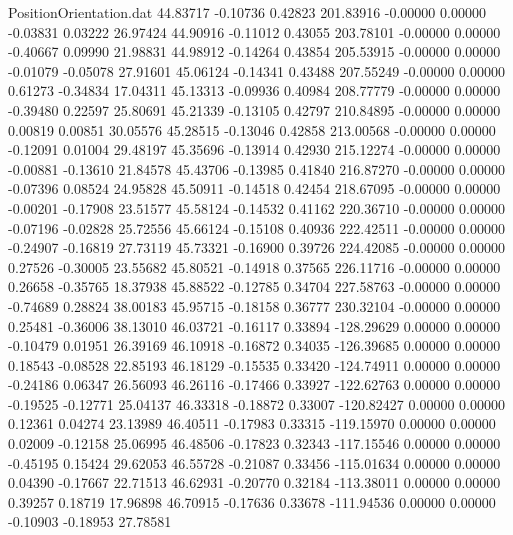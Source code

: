 \begin{filecontents}{PositionOrientation.dat}
  44.83717   -0.10736    0.42823   201.83916   -0.00000    0.00000   -0.03831    0.03222   26.97424
  44.90916   -0.11012    0.43055   203.78101   -0.00000    0.00000   -0.40667    0.09990   21.98831
  44.98912   -0.14264    0.43854   205.53915   -0.00000    0.00000   -0.01079   -0.05078   27.91601
  45.06124   -0.14341    0.43488   207.55249   -0.00000    0.00000    0.61273   -0.34834   17.04311
  45.13313   -0.09936    0.40984   208.77779   -0.00000    0.00000   -0.39480    0.22597   25.80691
  45.21339   -0.13105    0.42797   210.84895   -0.00000    0.00000    0.00819    0.00851   30.05576
  45.28515   -0.13046    0.42858   213.00568   -0.00000    0.00000   -0.12091    0.01004   29.48197
  45.35696   -0.13914    0.42930   215.12274   -0.00000    0.00000   -0.00881   -0.13610   21.84578
  45.43706   -0.13985    0.41840   216.87270   -0.00000    0.00000   -0.07396    0.08524   24.95828
  45.50911   -0.14518    0.42454   218.67095   -0.00000    0.00000   -0.00201   -0.17908   23.51577
  45.58124   -0.14532    0.41162   220.36710   -0.00000    0.00000   -0.07196   -0.02828   25.72556
  45.66124   -0.15108    0.40936   222.42511   -0.00000    0.00000   -0.24907   -0.16819   27.73119
  45.73321   -0.16900    0.39726   224.42085   -0.00000    0.00000    0.27526   -0.30005   23.55682
  45.80521   -0.14918    0.37565   226.11716   -0.00000    0.00000    0.26658   -0.35765   18.37938
  45.88522   -0.12785    0.34704   227.58763   -0.00000    0.00000   -0.74689    0.28824   38.00183
  45.95715   -0.18158    0.36777   230.32104   -0.00000    0.00000    0.25481   -0.36006   38.13010
  46.03721   -0.16117    0.33894  -128.29629    0.00000    0.00000   -0.10479    0.01951   26.39169
  46.10918   -0.16872    0.34035  -126.39685    0.00000    0.00000    0.18543   -0.08528   22.85193
  46.18129   -0.15535    0.33420  -124.74911    0.00000    0.00000   -0.24186    0.06347   26.56093
  46.26116   -0.17466    0.33927  -122.62763    0.00000    0.00000   -0.19525   -0.12771   25.04137
  46.33318   -0.18872    0.33007  -120.82427    0.00000    0.00000    0.12361    0.04274   23.13989
  46.40511   -0.17983    0.33315  -119.15970    0.00000    0.00000    0.02009   -0.12158   25.06995
  46.48506   -0.17823    0.32343  -117.15546    0.00000    0.00000   -0.45195    0.15424   29.62053
  46.55728   -0.21087    0.33456  -115.01634    0.00000    0.00000    0.04390   -0.17667   22.71513
  46.62931   -0.20770    0.32184  -113.38011    0.00000    0.00000    0.39257    0.18719   17.96898
  46.70915   -0.17636    0.33678  -111.94536    0.00000    0.00000   -0.10903   -0.18953   27.78581

\end{filecontents}
